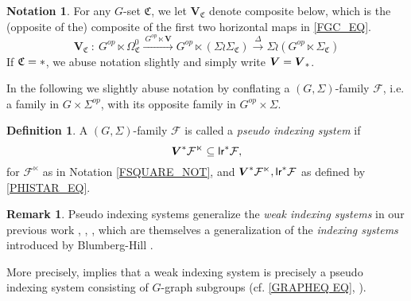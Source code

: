 \documentclass[a4paper,10pt
,draft
]{article}%
\numberwithin{equation}{section}
\numberwithin{figure}{section}
\theoremstyle{definition} %
\newtheorem{definition}[equation]{Definition}%
\newtheorem{remark}[equation]{Remark}%
\newtheorem{notation}[equation]{Notation}%
\newcommand{\F}{\ensuremath{\mathcal F}}
\newcommand{\1}{\ensuremath{\mathbbm 1}}%
\begin{document}
\begin{notation}
	For any $G$-set $\mathfrak C$, we let $\boldsymbol{V}_{\mathfrak C}$ denote composite below, which is 
	the (opposite of the) composite of the first two horizontal maps in \eqref{FGC_EQ}.
	\begin{equation}\label{VC_EQ}
	\boldsymbol{V}_{\mathfrak{C}} \ \colon \ 
	G^{op} \ltimes \Omega_{\mathfrak{C}}^{0}
	\xrightarrow{\ G^{op} \ltimes \boldsymbol{V} \ }
	G^{op} \ltimes \left(\Sigma \wr \Sigma_{\mathfrak{C}}\right)
	\xrightarrow{\ \Delta \ }
	\Sigma \wr  \left(G^{op} \ltimes \Sigma_{\mathfrak{C}} \right)
	\end{equation}
	If $\mathfrak C = \**$, we abuse notation slightly and simply write $\boldsymbol{V} = \boldsymbol{V}_{\**}$. 
\end{notation}


In the following 
we slightly abuse notation by conflating
a $(G,\Sigma)$-family $\F$,
i.e. a family in $G \times \Sigma^{op}$,
with its opposite family
in $G^{op} \times \Sigma$.


\begin{definition}\label{PIS_DEF}
	A $(G,\Sigma)$-family $\F$ is called a \textit{pseudo indexing system} if
	\begin{equation}\label{PIS_EQ}
	\boldsymbol{V}^{\**} \F^\ltimes \subseteq \mathsf{lr}^{\**}\F,
	\end{equation}
	for $\F^\ltimes$ as in Notation \ref{FSQUARE_NOT},
	and
	$\boldsymbol{V}^{\**} \F^\ltimes, \mathsf{lr}^{\**}\F$
	as defined by \eqref{PHISTAR_EQ}.
\end{definition}



\begin{remark}
	Pseudo indexing systems generalize the
	\textit{weak indexing systems} in our previous work
	\cite[Def. 9.5]{Per18}, \cite[Def. 4.58]{BP_geo}, \cite[Def. 6.2]{BP_edss},
	which are themselves a generalization of the 
	\textit{indexing systems} introduced by Blumberg-Hill \cite[Def. 3.22]{BH15}.
	
	More precisely, \cite[Rem. 6.47]{BP_geo} implies that
	a weak indexing system is precisely a pseudo indexing system consisting of $G$-graph subgroups (cf. \eqref{GRAPHEQ EQ}, \cite[Def. 6.36]{BP_geo}).
\end{remark}
\end{document}
